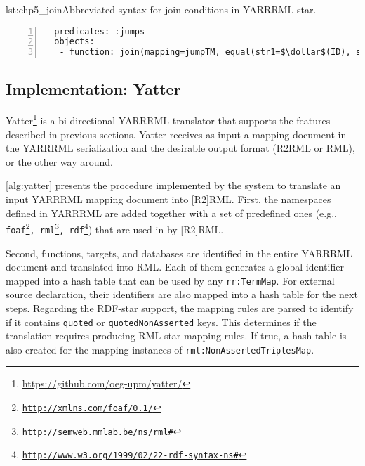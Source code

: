 
\begin{minipage}{\linewidth}
\centering
\begin{captionedlisting}{lst:chp5_join}{Abbreviated syntax for join conditions in YARRRML-star.}
\centering
{\begin{lstlisting}[numbers=left,basicstyle=\ttfamily\small,columns=flexible,language=yarrrmlstar]
- predicates: :jumps
  objects:
   - function: join(mapping=jumpTM, equal(str1=$\dollar$(ID), str2=$\dollar$(ID)))
\end{lstlisting}}
\end{captionedlisting}
\end{minipage}





\subsection{Implementation: Yatter}

Yatter\footnote{\label{foot:yatter}\url{https://github.com/oeg-upm/yatter/}} is a bi-directional YARRRML translator that supports the features described in previous sections. 
Yatter receives as input a mapping document in the YARRRML serialization and the desirable output format (R2RML or RML), or the other way around.




\cref{alg:yatter} presents the procedure implemented by the system to translate an input YARRRML mapping document into [R2]RML. 
First, %
the namespaces defined in YARRRML are added together with a set of predefined ones (e.g., \texttt{foaf\footnote{\url{http://xmlns.com/foaf/0.1/}}, rml\footnote{\url{http://semweb.mmlab.be/ns/rml\#}}, rdf\footnote{\url{http://www.w3.org/1999/02/22-rdf-syntax-ns\#}}}) that are used in by [R2]RML. 

Second, functions, targets, and databases are identified in the entire YARRRML document and translated into RML. Each of them generates a global identifier mapped into a hash table that can be used by any \texttt{rr:TermMap}. For external source declaration, their identifiers are also mapped into a hash table for the next steps.
Regarding the RDF-star support, the mapping rules are parsed to identify if it contains \texttt{quoted} or \texttt{quotedNonAsserted} keys.
This determines if the translation requires producing RML-star mapping rules.
If true, a hash table is also created for the mapping instances of \texttt{rml:NonAssertedTriplesMap}.


